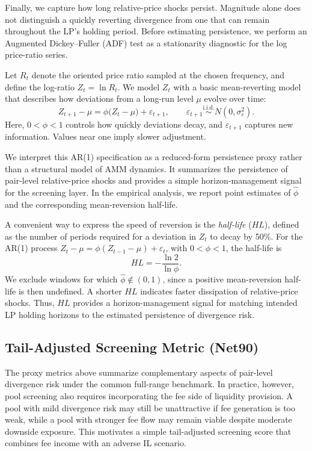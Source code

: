 \documentclass[10pt,conference,compsocconf]{IEEEtran}
\begin{document}
Finally, we capture how long relative-price shocks persist. Magnitude alone does not distinguish a quickly reverting divergence from one that can remain throughout the LP's holding period. Before estimating persistence, we perform an Augmented Dickey--Fuller (ADF) test as a stationarity diagnostic for the log price-ratio series.

Let \(R_t\) denote the oriented price ratio sampled at the chosen frequency, and define the log-ratio \(Z_t = \ln R_t\).
We model \(Z_t\) with a basic mean-reverting model that describes how deviations from a long-run level \(\mu\) evolve over time:
\begin{equation}
\label{eq:ar1_ratio}
Z_{t+1} - \mu = \phi \bigl(Z_t - \mu\bigr) + \varepsilon_{t+1}, 
\qquad \varepsilon_{t+1} \stackrel{\mathrm{i.i.d.}}{\sim} N(0, \sigma^2_\varepsilon).
\end{equation}
Here, $0<\phi<1$ controls how quickly deviations decay, and $\varepsilon_{t+1}$ captures new information. Values near one imply slower adjustment.

We interpret this AR(1) specification as a reduced-form persistence proxy rather than a structural model of AMM dynamics. It summarizes the persistence of pair-level relative-price shocks and provides a simple horizon-management signal for the screening layer. In the empirical analysis, we report point estimates of $\hat{\phi}$ and the corresponding mean-reversion half-life.

A convenient way to express the speed of reversion is the \emph{half-life} ($HL$), defined as the number of periods required for a deviation in $Z_t$ to decay by 50\%. For the AR(1) process $Z_t-\mu=\phi(Z_{t-1}-\mu)+\varepsilon_t$, with $0<\phi<1$, the
half-life is
\[
HL=-\frac{\ln 2}{\ln\phi}.
\]
We exclude windows for which $\hat{\phi}\notin(0,1)$, since a positive mean-reversion half-life is then undefined. A shorter $HL$ indicates faster dissipation of relative-price shocks. Thus, $HL$ provides a horizon-management signal for matching intended LP holding horizons to the estimated persistence of divergence risk.

\subsection{Tail-Adjusted Screening Metric (Net90)}
\label{subsec:net90}

The proxy metrics above summarize complementary aspects of pair-level divergence risk under the common full-range benchmark. In practice, however, pool screening also requires incorporating the fee side of liquidity provision. A pool with mild divergence risk may still be unattractive if fee generation is too weak, while a pool with stronger fee flow may remain viable despite moderate downside exposure. This motivates a simple tail-adjusted screening score that combines fee income with an adverse IL scenario.
\end{document}
